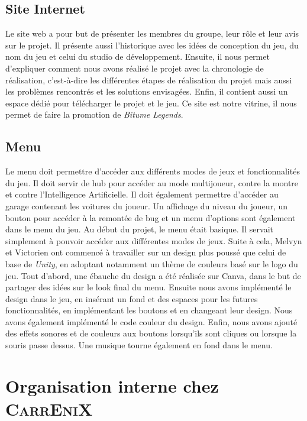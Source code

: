 \documentclass[12pt,a4paper]{article}
\newcommand{\btmlgs}{\textsl{Bitume Legends}}
\newcommand{\AI}{Intelligence Artificielle}
\newcommand{\CEX}{\textsc{CarrEniX}}
\begin{document}
    \subsection{Site Internet}
        Le site web a pour but de présenter les membres du groupe, leur rôle et leur avis sur le projet.
        Il présente aussi l'historique avec les idées de conception du jeu, du nom du jeu et celui du studio
        de développement. Ensuite, il nous permet d'expliquer comment nous avons réalisé le projet avec la
        chronologie de réalisation, c'est-à-dire les différentes étapes de réalisation du projet mais aussi
        les problèmes rencontrés et les solutions envisagées. Enfin, il contient aussi
        un espace dédié pour télécharger le projet et le jeu. Ce site est notre vitrine, il nous permet de faire
        la promotion de \btmlgs.
  
  
  
    \subsection{Menu}
        Le menu doit permettre d'accéder aux différents modes de jeux et fonctionnalités du jeu.
        Il doit servir de hub pour accéder au mode multijoueur, contre la montre et contre l'\AI.
        Il doit également permettre d'accéder au garage contenant les voitures du joueur. Un affichage
        du niveau du joueur, un bouton pour accéder à la remontée de bug et un menu d'options 
        sont également dans le menu du jeu. Au début du projet, le menu était basique. Il servait 
        simplement à pouvoir accéder aux différentes modes de jeux. Suite à cela, Melvyn et Victorien 
        ont commencé à travailler sur un design plus poussé que celui de base de \textsl{Unity}, 
        en adoptant notamment un thème de couleurs basé sur le logo du jeu. Tout d'abord, une
        ébauche du design a été réalisée sur Canva, dans le but de partager des idées sur le look
        final du menu. Ensuite nous avons implémenté le design dans le jeu, en insérant un fond
        et des espaces pour les futures fonctionnalités, en implémentant les boutons et en changeant
        leur design. Nous avons également implémenté le code couleur du design. Enfin, nous avons 
        ajouté des effets sonores et de couleurs aux boutons lorsqu'ils sont cliques ou lorsque
        la souris passe dessus. Une musique tourne également en fond dans le menu.

\clearpage

\section{Organisation interne chez \CEX}
\end{document}
